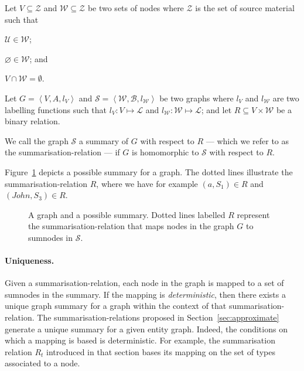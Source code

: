 \begin{definition}
Let $V \subseteq \mathcal{Z}$ and $\mathcal{W} \subseteq \mathcal{Z}$ be two sets of nodes where $\mathcal{Z}$ is the set of source material such that
\begin{inparaenum}[(a)]
	\item $\mathcal{U} \in \mathcal{W}$;
	\item $\varnothing \in \mathcal{W}$; and
	\item $V \cap \mathcal{W} = \emptyset$.
\end{inparaenum}

Let $G=\left\langle V, A, l_V \right\rangle$ and $\mathcal{S}=\left\langle \mathcal{W}, \mathcal{B}, l_\mathcal{W} \right\rangle$ be two graphs where $l_V$ and $l_\mathcal{W}$ are two labelling functions such that $l_V : V \mapsto \mathcal{L}$ and $l_\mathcal{W} : \mathcal{W} \mapsto \mathcal{L}$; and let $R \subseteq V \times \mathcal{W}$ be a binary relation.

We call the graph $\mathcal{S}$ a summary of $G$ with respect to $R$ --- which we refer to as the \gls{summarisation-relation} --- if $G$ is homomorphic to $\mathcal{S}$ with respect to $R$.
\end{definition}

Figure~\ref{chap4:summary:fig:basic-summary} depicts a possible summary for a graph. The dotted lines illustrate the \gls{summarisation-relation} $R$, where we have for example $(a, S_1) \in R$ and $(John, S_3) \in R$.

\begin{figure}
	\centering
	\resizebox{.7\textwidth}{!}{
		
	}
	\caption[A graph and a possible summary]{A graph and a possible summary. Dotted lines labelled $R$ represent the \gls{summarisation-relation} that maps nodes in the graph $G$ to sumnodes in $\mathcal{S}$.}
	\label{chap4:summary:fig:basic-summary}
\end{figure}

\paragraph{Uniqueness.}

Given a \gls{summarisation-relation}, each node in the graph is mapped to a set of sumnodes in the summary. If the mapping is \emph{deterministic}, then there exists a unique graph summary for a graph within the context of that \gls{summarisation-relation}. The \glspl{summarisation-relation} proposed in Section~\ref{sec:approximate} generate a unique summary for a given entity graph. Indeed, the conditions on which a mapping is based is deterministic. For example, the summarisation relation $R_t$ introduced in that section bases its mapping on the set of \gls{types} associated to a node.

